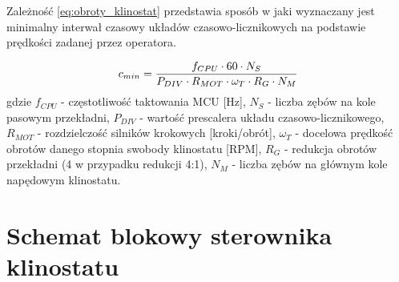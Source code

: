 Zależność \ref{eq:obroty_klinostat} przedstawia sposób w jaki wyznaczany jest minimalny interwał czasowy układów czasowo-licznikowych na podstawie prędkości zadanej przez operatora.

\begin{equation}\label{eq:obroty_klinostat}
	c_{min} = \frac{f_{CPU} \cdot 60 \cdot N_S}{P_{DIV} \cdot R_{MOT} \cdot \omega_T \cdot R_G \cdot N_M}
	\vspace{3mm}
\end{equation}
gdzie $f_{CPU}$ - częstotliwość taktowania MCU  [Hz], $N_S$ - liczba zębów na kole pasowym przekładni, $P_{DIV}$ - wartość prescalera układu czasowo-licznikowego, $R_{MOT}$ - rozdzielczość silników krokowych [kroki/obrót], $\omega_T$ - docelowa prędkość obrotów danego stopnia swobody klinostatu [RPM], $R_G$ - redukcja obrotów przekładni (4 w przypadku redukcji 4:1), $N_M$ - liczba zębów na głównym kole napędowym klinostatu.

\section{Schemat blokowy sterownika klinostatu}

